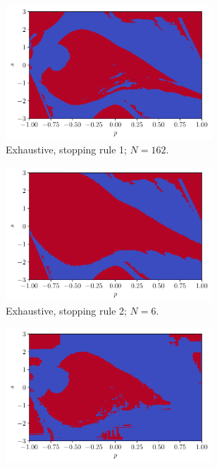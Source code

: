 \documentclass[a4paper, 12pt]{article}
\begin{document}
    \begin{figure}[H]
        \centering
        \begin{subfigure}{0.49\textwidth}
            \centering
            \includegraphics[width=0.85\textwidth]{resources/pdf/4_exhaustive_1_XRT_mu.pdf}
            \caption{Exhaustive, stopping rule 1; $N = 162$.}
            \vspace{0.5em}
        \end{subfigure}
        \hfill
        \begin{subfigure}{0.49\textwidth}
            \centering
            \includegraphics[width=0.85\textwidth]{resources/pdf/4_exhaustive_2_XRT_mu.pdf}
            \caption{Exhaustive, stopping rule 2; $N = 6$.}
            \vspace{0.5em}
        \end{subfigure}
        \begin{subfigure}{0.49\textwidth}
            \centering
            \includegraphics[width=0.85\textwidth]{resources/pdf/4_montecarlo_1_XRT_mu.pdf}

\end{subfigure}
\end{figure}
\end{document}
